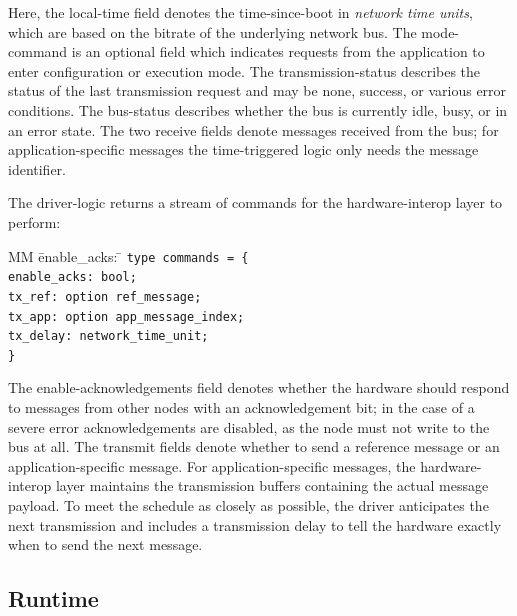 \documentclass[a4paper,UKenglish,cleveref, autoref, thm-restate,anonymous]{lipics-v2021}
\begin{document}
Here, the local-time field denotes the time-since-boot in \emph{network time units}, which are based on the bitrate of the underlying network bus.
The mode-command is an optional field which indicates requests from the application to enter configuration or execution mode.
The transmission-status describes the status of the last transmission request and may be none, success, or various error conditions.
The bus-status describes whether the bus is currently idle, busy, or in an error state.
The two receive fields denote messages received from the bus; for application-specific messages the time-triggered logic only needs the message identifier.

The driver-logic returns a stream of commands for the hardware-interop layer to perform:

\begin{tabbing}
  MM \= enable_acks: \= \kill
  \tt{type} commands = \{ \\
  \> enable_acks: \> bool; \\
  \> tx_ref: \>       option ref_message; \\
  \> tx_app: \> option app_message_index; \\
  \> tx_delay: \>     network_time_unit; \\
 \}
\end{tabbing}

The enable-acknowledgements field denotes whether the hardware should respond to messages from other nodes with an acknowledgement bit; in the case of a severe error acknowledgements are disabled, as the node must not write to the bus at all.
The transmit fields denote whether to send a reference message or an application-specific message.
For application-specific messages, the hardware-interop layer maintains the transmission buffers containing the actual message payload.
To meet the schedule as closely as possible, the driver anticipates the next transmission and includes a transmission delay to tell the hardware exactly when to send the next message.

\subsection{Runtime}
\end{document}
